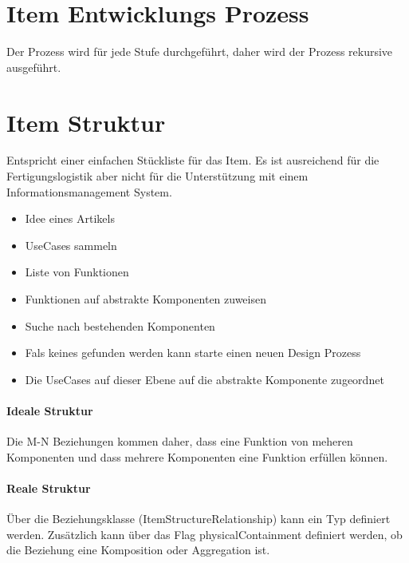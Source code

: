 
\section{Item Entwicklungs Prozess}

Der Prozess wird für jede Stufe durchgeführt, daher wird der Prozess rekursive ausgeführt.


\section{Item Struktur}
Entspricht einer einfachen Stückliste für das Item. Es ist ausreichend für die Fertigungslogistik aber nicht für die Unterstützung mit einem Informationsmanagement System.

\begin{itemize}
\item Idee eines Artikels
\item UseCases sammeln
\item Liste von Funktionen 
\item Funktionen auf abstrakte Komponenten zuweisen
\item Suche nach bestehenden Komponenten
\item Fals keines gefunden werden kann starte einen neuen Design Prozess
\item Die UseCases auf dieser Ebene auf die abstrakte Komponente zugeordnet 
\end{itemize}

\newpage
\paragraph{Ideale Struktur}
Die M-N Beziehungen kommen daher, dass eine Funktion von meheren Komponenten und dass mehrere Komponenten eine Funktion erfüllen können.


\newpage
\paragraph{Reale Struktur}
Über die Beziehungsklasse (ItemStructureRelationship) kann ein Typ definiert werden. Zusätzlich kann über das Flag physicalContainment definiert werden, ob die Beziehung eine Komposition oder Aggregation ist.

